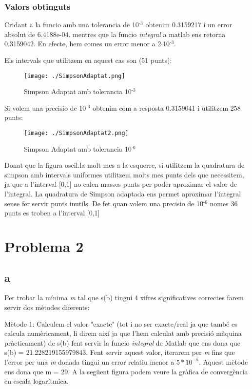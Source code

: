 \documentclass{article}
\begin{document}
\subsubsection{Valors obtinguts}
\label{sec:orgd243ae8}
Cridant a la funcio amb una tolerancia de 10\(^{\text{-3}}\) obtenim 0.3159217 i un error absolut de 6.4188e-04. mentres que la funcio \emph{integral} a matlab ens retorna 0.3159042. En efecte, hem comes un error menor a 2\(\cdot\)10\(^{\text{-3}}\).

Els intervals que utilitzem en aquest cas son (51 punts):

\begin{figure}[htbp]
\centering
\texttt{[image: ./SimpsonAdaptat.png]}
\caption{\label{fig:org1deb30d}
Simpson Adaptat amb tolerancia 10\(^{\text{-3}}\)}
\end{figure}

Si volem una precisio de 10\(^{\text{-6}}\) obtenim com a resposta 0.3159041 i utilitzem 258 punts:

\begin{figure}[H]
\centering
\texttt{[image: ./SimpsonAdaptat2.png]}
\caption{\label{fig:org58465fd}
Simpson Adaptat amb tolerancia 10\(^{\text{-6}}\)}
\end{figure}

Donat que la figura oscil.la molt mes a la esquerre, si utilitzem la quadratura de simpson amb intervals uniformes utilitzem molts mes punts dels que necessitem, ja que a l'interval [0,1] no calen masses punts per poder aproximar el valor de l'integral. La quadratura de Simpson adaptada ens permet aproximar l'integral sense fer servir punts inutils. De fet quan volem una precisio de 10\(^{\text{-6}}\) nomes 36 punts es troben a l'interval [0,1]
\newpage
\section{Problema 2}

\subsection{a}

Per trobar la mínima \emph{m} tal que s(b) tingui 4 xifres significatives correctes farem servir dos mètodes diferents:

Mètode 1: Calculem el valor "exacte" (tot i no ser exacte/real ja que també es calcula numèricament, li direm així ja que l'hem calculat amb precisió màquina pràcticament) de s(b) fent servir la funcio \emph{integral} de Matlab que ens dona que s(b) = 21.228219155979843. Fent servir aquest valor, iterarem per \emph{m} fins que l'error per una \emph{m} donada tingui un error relatiu menor a
$5*10^{-5}$. Aquest mètode ens dona que m = 29. A la següent figura podem veure la gràfica de convergència en escala logarítmica.
\end{document}
